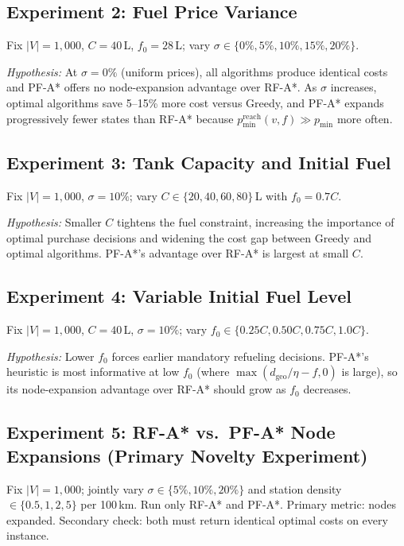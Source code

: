 \subsection{Experiment 2: Fuel Price Variance}

Fix $|V|=1{,}000$, $C=40$\,L, $f_0=28$\,L; vary $\sigma \in \{0\%,5\%,10\%,15\%,20\%\}$.

\textit{Hypothesis:} At $\sigma=0\%$ (uniform prices), all algorithms produce identical costs
and PF-A* offers no node-expansion advantage over RF-A*.
As $\sigma$ increases, optimal algorithms save 5--15\% more cost versus Greedy, and PF-A*
expands progressively fewer states than RF-A* because
$p_{\min}^{\mathrm{reach}}(v,f) \gg p_{\min}$ more often.

\subsection{Experiment 3: Tank Capacity and Initial Fuel}

Fix $|V|=1{,}000$, $\sigma=10\%$; vary $C \in \{20,40,60,80\}$\,L with $f_0=0.7C$.

\textit{Hypothesis:} Smaller $C$ tightens the fuel constraint, increasing the importance of
optimal purchase decisions and widening the cost gap between Greedy and optimal algorithms.
PF-A*'s advantage over RF-A* is largest at small $C$.

\subsection{Experiment 4: Variable Initial Fuel Level}

Fix $|V|=1{,}000$, $C=40$\,L, $\sigma=10\%$; vary
$f_0 \in \{0.25C, 0.50C, 0.75C, 1.0C\}$.

\textit{Hypothesis:} Lower $f_0$ forces earlier mandatory refueling decisions.
PF-A*'s heuristic is most informative at low $f_0$ (where $\max(d_{\mathrm{geo}}/\eta - f, 0)$
is large), so its node-expansion advantage over RF-A* should grow as $f_0$ decreases.

\subsection{Experiment 5: RF-A* vs.\ PF-A* Node Expansions (Primary Novelty Experiment)}

Fix $|V|=1{,}000$; jointly vary $\sigma \in \{5\%,10\%,20\%\}$ and station density
$\in \{0.5, 1, 2, 5\}$ per 100\,km.
Run only RF-A* and PF-A*.
Primary metric: nodes expanded.
Secondary check: both must return identical optimal costs on every instance.


